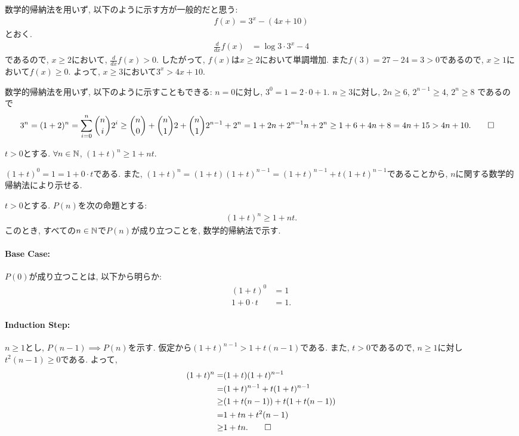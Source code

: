 \begin{rem}
  数学的帰納法を用いず, 以下のように示す方が一般的だと思う:
  \begin{align*}
    f(x)=3^x-(4x+10)
  \end{align*}
  とおく.
  \begin{align*}
    \frac{d}{dx}f(x)&=\log 3 \cdot 3^x-4
  \end{align*}
  であるので,
  $x\geq 2$において,
  $\frac{d}{dx}f(x)> 0$.
  したがって, $f(x)$は$x\geq 2$において単調増加.
  また$f(3)=27-24=3>0$であるので,
  $x\geq 1$において$f(x) \geq 0$.
  よって, $x\geq 3$において$3^x > 4x+10$.
\end{rem}
\begin{rem}
  数学的帰納法を用いず, 以下のように示すこともできる:
  $n=0$に対し, $3^0=1=2\cdot0+1$.
  $n\geq 3$に対し, $2n\geq 6$, $2^{n-1}\geq 4$, $2^n\geq 8$
  であるので
  \begin{align*}
    3^n=(1+2)^n=\sum_{i=0}^n \binom{n}{i}2^i
    &\geq \binom{n}{0}+\binom{n}{1}2+\binom{n}{1}2^{n-1}+2^{n}
    =1+2n+2^{n-1}n+2^n
    \geq 1+6+4n+8=4n+15>4n+10
    .\qedhere
  \end{align*}
\end{rem}

\begin{prop}
  \label{p:20230821}
  $t>0$とする.
  $\forall n\in\mathbb{N}$,
  $(1+t)^n\geq 1+nt$.
\end{prop}
\begin{proof**}
  $(1+t)^0=1=1+0\cdot t$である.
  また, 
  $(1+t)^n=(1+t)(1+t)^{n-1}=(1+t)^{n-1}+t(1+t)^{n-1}$であることから,
  $n$に関する数学的帰納法により示せる.
\end{proof**}
\begin{proof*}
  $t>0$とする.
  $P(n)$を次の命題とする:
  \begin{align*}
    (1+t)^n\geq 1+nt
    .
  \end{align*}
  このとき,
  すべての$n\in\mathbb{N}$で$P(n)$が成り立つことを,
  数学的帰納法で示す.

  \paragraph{Base Case:}
  $P(0)$が成り立つことは, 以下から明らか:
  \begin{align*}
    (1+t)^0&=1\\
     1+0\cdot t&=1.
  \end{align*}
  \paragraph{Induction Step:}
  $n\geq 1$とし,
  $P(n-1)\implies P(n)$を示す.
  仮定から$(1+t)^{n-1}> 1+t(n-1)$である.
  また, $t>0$であるので, 
  $n\geq 1$に対し$t^2(n-1)\geq 0$である.
  よって,
  \begin{align*}
    (1+t)^n=&(1+t)(1+t)^{n-1}\\
    =&(1+t)^{n-1}+t(1+t)^{n-1}\\
    \geq&
    (1+t(n-1))+t(1+t(n-1))\\
    =&1+tn+t^2(n-1)\\
    \geq&1+tn
    .\qedhere
  \end{align*}
\end{proof*}

